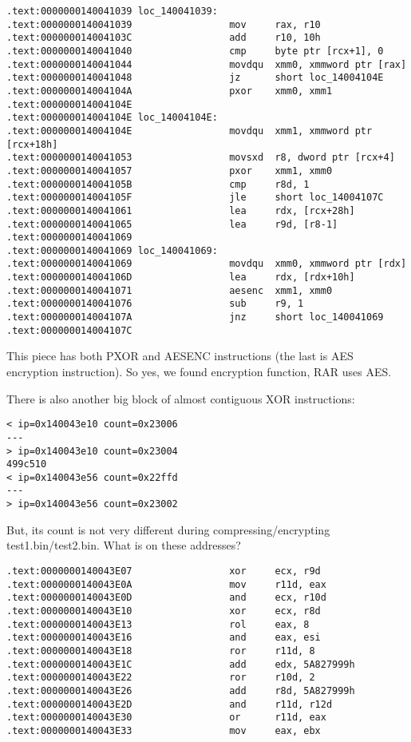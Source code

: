 \begin{lstlisting}
.text:0000000140041039 loc_140041039:
.text:0000000140041039                 mov     rax, r10
.text:000000014004103C                 add     r10, 10h
.text:0000000140041040                 cmp     byte ptr [rcx+1], 0
.text:0000000140041044                 movdqu  xmm0, xmmword ptr [rax]
.text:0000000140041048                 jz      short loc_14004104E
.text:000000014004104A                 pxor    xmm0, xmm1
.text:000000014004104E
.text:000000014004104E loc_14004104E:
.text:000000014004104E                 movdqu  xmm1, xmmword ptr [rcx+18h]
.text:0000000140041053                 movsxd  r8, dword ptr [rcx+4]
.text:0000000140041057                 pxor    xmm1, xmm0
.text:000000014004105B                 cmp     r8d, 1
.text:000000014004105F                 jle     short loc_14004107C
.text:0000000140041061                 lea     rdx, [rcx+28h]
.text:0000000140041065                 lea     r9d, [r8-1]
.text:0000000140041069
.text:0000000140041069 loc_140041069:
.text:0000000140041069                 movdqu  xmm0, xmmword ptr [rdx]
.text:000000014004106D                 lea     rdx, [rdx+10h]
.text:0000000140041071                 aesenc  xmm1, xmm0
.text:0000000140041076                 sub     r9, 1
.text:000000014004107A                 jnz     short loc_140041069
.text:000000014004107C
\end{lstlisting}

This piece has both PXOR and AESENC instructions (the last is \ac{AES} encryption instruction).
So yes, we found encryption function, RAR uses \ac{AES}.

There is also another big block of almost contiguous XOR instructions:

\begin{lstlisting}
< ip=0x140043e10 count=0x23006
---
> ip=0x140043e10 count=0x23004
499c510
< ip=0x140043e56 count=0x22ffd
---
> ip=0x140043e56 count=0x23002
\end{lstlisting}

But, its count is not very different during compressing/encrypting test1.bin/test2.bin.
What is on these addresses?

\begin{lstlisting}
.text:0000000140043E07                 xor     ecx, r9d
.text:0000000140043E0A                 mov     r11d, eax
.text:0000000140043E0D                 and     ecx, r10d
.text:0000000140043E10                 xor     ecx, r8d
.text:0000000140043E13                 rol     eax, 8
.text:0000000140043E16                 and     eax, esi
.text:0000000140043E18                 ror     r11d, 8
.text:0000000140043E1C                 add     edx, 5A827999h
.text:0000000140043E22                 ror     r10d, 2
.text:0000000140043E26                 add     r8d, 5A827999h
.text:0000000140043E2D                 and     r11d, r12d
.text:0000000140043E30                 or      r11d, eax
.text:0000000140043E33                 mov     eax, ebx
\end{lstlisting}

